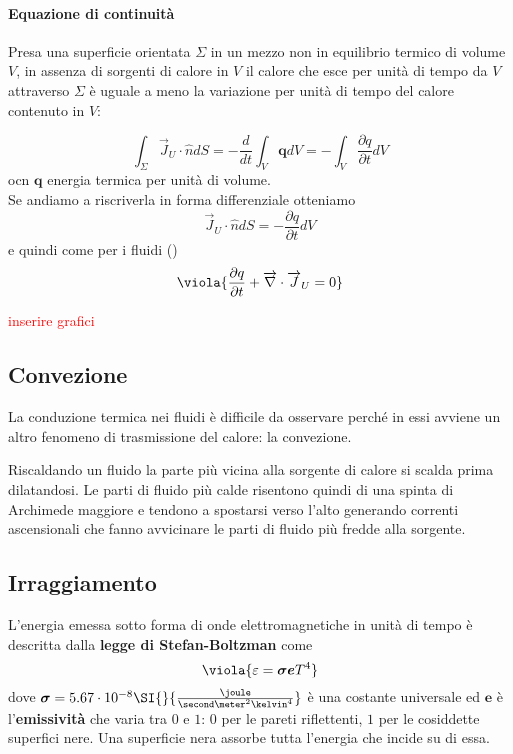 \paragraph{Equazione di continuità} Presa una superficie orientata \(\Sigma\) in un mezzo non in equilibrio termico di volume \(V\), in assenza di sorgenti di calore in \(V\) il calore che esce per unità di tempo da \(V\) attraverso \(\Sigma\) è uguale a meno la variazione per unità di tempo del calore contenuto in \(V\):

\[ 
\int_{\Sigma} \overrightarrow{J}_U \cdot \hat{n} dS = -\frac{d}{dt}\int_V \boldsymbol{q} dV = - \int_V \frac{\partial q}{\partial t} dV
\]
ocn \(\boldsymbol{q}\) energia termica per unità di volume. \\

\noindent
Se andiamo a riscriverla in forma differenziale otteniamo
\[ 
\overrightarrow{J}_U \cdot \hat{n}dS = - \frac{\partial q}{\partial t} dV
\]
e quindi come per i fluidi ()
\begin{equation}
	\viola{	\frac{\partial q}{\partial t} + \overrightarrow{\nabla} \cdot \overrightarrow{J}_U  = 0 }
\end{equation}

\begin{center}
	\textcolor{red}{inserire grafici}
\end{center}


\subsection{Convezione}
La conduzione termica nei fluidi è difficile da osservare perché in essi avviene un altro fenomeno di trasmissione del calore: la convezione.

Riscaldando un fluido la parte più vicina alla sorgente di calore si scalda prima dilatandosi. Le parti di fluido più calde risentono quindi di una spinta di Archimede maggiore e tendono a spostarsi verso l'alto generando correnti ascensionali che fanno avvicinare le parti di fluido più fredde alla sorgente. 

\subsection{Irraggiamento}
L'energia emessa sotto forma di onde elettromagnetiche in unità di tempo è descritta dalla \textbf{legge di Stefan-Boltzman} come
\begin{equation}\label{stefan boltzman}
	\viola{\varepsilon = \boldsymbol{\sigma e}T^4}
\end{equation}
dove \(\boldsymbol{\sigma} = 5.67\cdot 10^{-8}\SI{}{\frac{\joule}{\second\meter^2\kelvin^4}}\) è una costante universale ed \(\boldsymbol{e}\) è l'\textbf{emissività} che varia tra \(0\) e \(1\): \(0\) per le pareti riflettenti, \(1\) per le cosiddette superfici nere. Una superficie nera assorbe tutta l'energia che incide su di essa.

